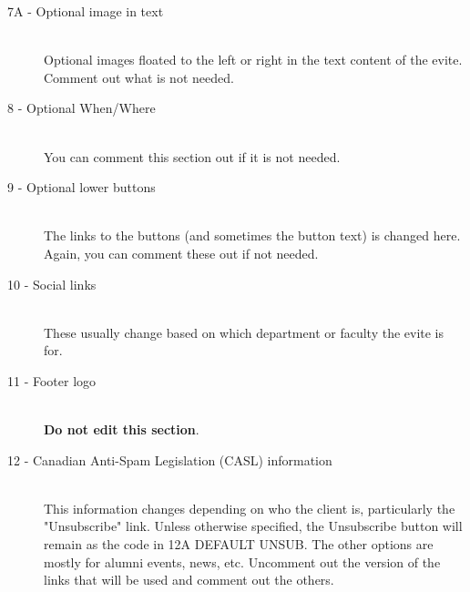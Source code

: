 \documentclass[a4paper,11pt]{article}
\begin{document}
\begin{description}
		\item[7A - Optional image in text] \hfill \\
		Optional images floated to the left or right in the text content of the evite. Comment out what is not needed.
		\item[8 - Optional When/Where] \hfill \\
		You can comment this section out if it is not needed.
		\item[9 - Optional lower buttons] \hfill \\
		The links to the buttons (and sometimes the button text) is changed here. Again, you can comment these out if not needed.
		\item[10 - Social links] \hfill \\
		These usually change based on which department or faculty the evite is for.
		\item[11 - Footer logo] \hfill \\
		\textbf{Do not edit this section}.
		\item[12 - Canadian Anti-Spam Legislation (CASL) information] \hfill \\
		This information changes depending on who the client is, particularly the "Unsubscribe" link. Unless otherwise specified, the Unsubscribe button will remain as the code in 12A DEFAULT UNSUB. The other options are mostly for alumni events, news, etc. Uncomment out the version of the links that will be used and comment out the others.
	\end{description}
	
\end{document}
